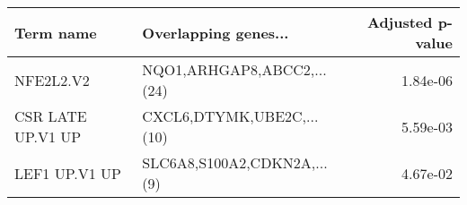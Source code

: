\begin{tabular}{llr}
\toprule
        Term name &        Overlapping genes... &  Adjusted p-value \\
\midrule
        NFE2L2.V2 &  NQO1,ARHGAP8,ABCC2,...(24) &          1.84e-06 \\
CSR LATE UP.V1 UP &   CXCL6,DTYMK,UBE2C,...(10) &          5.59e-03 \\
    LEF1 UP.V1 UP & SLC6A8,S100A2,CDKN2A,...(9) &          4.67e-02 \\
\bottomrule
\end{tabular}

